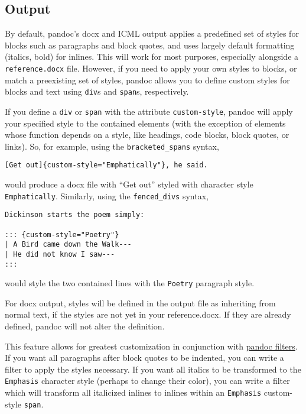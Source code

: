 \documentclass[
  a4paper,
]{article}
\begin{document}
\hypertarget{output}{%
\subsection{Output}\label{output}}

By default, pandoc's docx and ICML output applies a predefined set of
styles for blocks such as paragraphs and block quotes, and uses largely
default formatting (italics, bold) for inlines. This will work for most
purposes, especially alongside a \texttt{reference.docx} file. However,
if you need to apply your own styles to blocks, or match a preexisting
set of styles, pandoc allows you to define custom styles for blocks and
text using \texttt{div}s and \texttt{span}s, respectively.

If you define a \texttt{div} or \texttt{span} with the attribute
\texttt{custom-style}, pandoc will apply your specified style to the
contained elements (with the exception of elements whose function
depends on a style, like headings, code blocks, block quotes, or links).
So, for example, using the \texttt{bracketed\_spans} syntax,

\begin{verbatim}
[Get out]{custom-style="Emphatically"}, he said.
\end{verbatim}

would produce a docx file with ``Get out'' styled with character style
\texttt{Emphatically}. Similarly, using the \texttt{fenced\_divs}
syntax,

\begin{verbatim}
Dickinson starts the poem simply:

::: {custom-style="Poetry"}
| A Bird came down the Walk---
| He did not know I saw---
:::
\end{verbatim}

would style the two contained lines with the \texttt{Poetry} paragraph
style.

For docx output, styles will be defined in the output file as inheriting
from normal text, if the styles are not yet in your reference.docx. If
they are already defined, pandoc will not alter the definition.

This feature allows for greatest customization in conjunction with
\href{https://pandoc.org/filters.html}{pandoc filters}. If you want all
paragraphs after block quotes to be indented, you can write a filter to
apply the styles necessary. If you want all italics to be transformed to
the \texttt{Emphasis} character style (perhaps to change their color),
you can write a filter which will transform all italicized inlines to
inlines within an \texttt{Emphasis} custom-style \texttt{span}.
\end{document}
